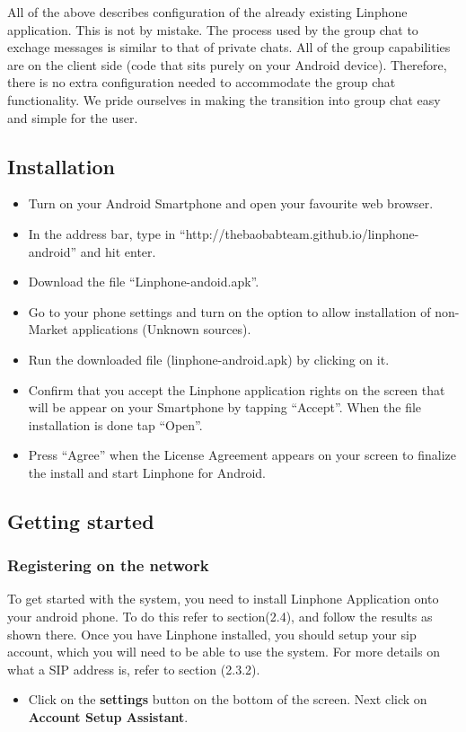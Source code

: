 \documentclass[a4paper]{article}
\begin{document}
All of the above describes configuration of the already existing Linphone application. This is not by mistake. The process used by the group chat to exchage messages is similar to that of private chats. All of the group capabilities are on the client side (code that sits purely on your Android device). Therefore, there is no extra configuration needed to accommodate the group chat functionality. We pride ourselves in making the transition into group chat easy and simple for the user.


\subsection{Installation}
\begin{itemize}
\item Turn on your Android Smartphone and open your favourite web browser.
\item In the address bar, type in “http://thebaobabteam.github.io/linphone-android” and hit enter.
\item Download the file “Linphone-andoid.apk”.
\item Go to your phone settings and turn on the option to allow installation of non-Market applications (Unknown sources).
\item Run the downloaded file (linphone-android.apk) by clicking on it.
\item Confirm that you accept the Linphone application rights on the screen that will be appear on your Smartphone by tapping “Accept”. When the file installation is done tap “Open”.
\item Press “Agree” when the License Agreement appears on your screen to finalize the install and start Linphone for Android.
\end{itemize}

\subsection{Getting started}
\subsubsection{Registering on the network}
To get started with the system, you need to install Linphone Application onto your android phone. To do this refer to section(2.4), and follow the results as shown there.
Once you have Linphone installed, you should setup your sip account, which you will need to be able to use the system. For more details on what a SIP address is, refer to section (2.3.2).
\begin{itemize}
\item Click on the \textbf{settings} button on the bottom of the screen. Next click on  \textbf{Account Setup Assistant}.
\end{itemize}
\end{document}
